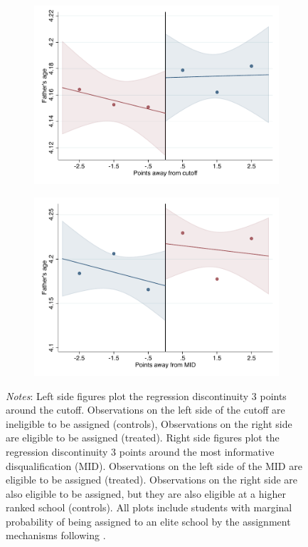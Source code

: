 \documentclass[oneside,11pt]{article}
\begin{document}
\begin{figure}[H]
\begin{center}
    \begin{subfigure}{0.475\textwidth}
        \centering
        \includegraphics[width=\textwidth]{04_Figures/rd_plot_tau_edad_pad_IPN3.pdf}
    \end{subfigure}
    \begin{subfigure}{0.475\textwidth}
        \centering
        \includegraphics[width=\textwidth]{04_Figures/rd_plot_mid_edad_pad_IPN3.pdf}
    \end{subfigure}
    \end{center}
    
\footnotesize
\textit{Notes}: Left side figures plot the regression discontinuity 3 points around the cutoff. Observations on the left side of the cutoff are ineligible to be assigned (controls), Observations on the right side are eligible to be assigned (treated). Right side figures plot the regression discontinuity 3 points around the most informative disqualification (MID). Observations on the left side of the MID are eligible to be assigned (treated). Observations on the right side are also eligible to be assigned, but they are also eligible at a higher ranked school (controls). All plots include students with marginal probability of being assigned to an elite school by the assignment mechanisms following \citet{abdulkadirouglu2022breaking}. 
\end{figure}
\end{document}
